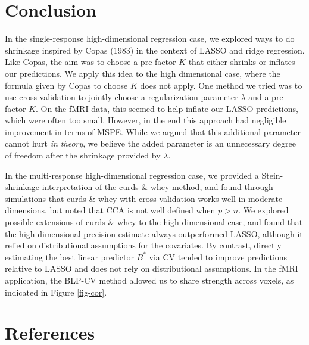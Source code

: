\documentclass[main]{subfiles}
\begin{document}
\section{Conclusion}

In the single-response high-dimensional regression case, we explored ways to do
shrinkage inspired by Copas (1983) in the context of LASSO and ridge regression.
Like Copas, the aim was to choose a pre-factor $K$ that either shrinks or inflates our predictions.
We apply this idea to the high dimensional case,
where the formula given by Copas to choose $K$ does not apply. One method we tried was to
use cross validation to jointly choose a regularization parameter $\lambda$
and a pre-factor $K$. On the fMRI data, this seemed to help inflate our LASSO
predictions, which were often too small. However, in the end this approach had
negligible improvement in terms of MSPE.
While we argued that this additional parameter cannot hurt {\sl in theory},
we believe the added parameter is an unnecessary degree of freedom after the
shrinkage provided by $\lambda$.

In the multi-response high-dimensional regression case, we provided a Stein-shrinkage interpretation of the curds \& whey method, and found through simulations that curds \& whey with cross validation works well in moderate dimensions, but noted that CCA is not well defined when $p > n$. We explored possible extensions of curds \& whey to the high dimensional case, and found that the high dimensional precision estimate always outperformed LASSO, although it relied on distributional assumptions for the covariates. By contrast, directly estimating the best linear predictor $B^*$ via CV tended to improve predictions relative to LASSO and does not rely on distributional assumptions. In the fMRI application, the BLP-CV method  allowed us to share strength across voxels, as indicated in Figure \ref{fig-cor}.



\vfill

\section{References}
\end{document}
